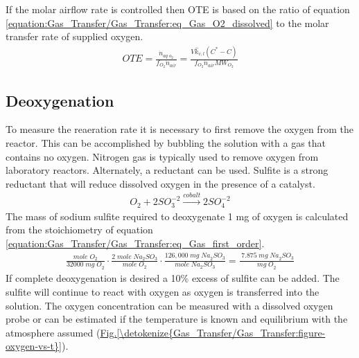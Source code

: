 \documentclass[letterpaper,10pt,english]{sphinxmanual}
\begin{document}
If the molar airflow rate is controlled then OTE is based on the ratio of equation \eqref{equation:Gas_Transfer/Gas_Transfer:eq_Gas_O2_dissolved} to the molar transfer rate of supplied oxygen.
\begin{equation}\label{equation:Gas_Transfer/Gas_Transfer:Gas_Transfer/Gas_Transfer:4}
\begin{split}OTE=\frac{\dot{n}_{aq\; o_{2} } }{f_{O_{2} } \dot{n}_{air} } =\frac{V\hat{k}_{v,l} \left(C^{*} -C\right)}{f_{O_{2} } \dot{n}_{air} MW_{O_{2} } }\end{split}
\end{equation}

\subsection{Deoxygenation}
\label{\detokenize{Gas_Transfer/Gas_Transfer:deoxygenation}}\label{\detokenize{Gas_Transfer/Gas_Transfer:heading-gas-transfer-deoxygenation}}
To measure the reaeration rate it is necessary to first remove the oxygen from the reactor. This can be accomplished by bubbling the solution with a gas that contains no oxygen. Nitrogen gas is typically used to remove oxygen from laboratory reactors. Alternately, a reductant can be used. Sulfite is a strong reductant that will reduce dissolved oxygen in the presence of a catalyst.
\begin{equation}\label{equation:Gas_Transfer/Gas_Transfer:Gas_Transfer/Gas_Transfer:5}
\begin{split}{O}_{{2}} +{2SO}_{{3}}^{-{2}} \stackrel{{cobalt}}{\longrightarrow}{2SO}_{{4}}^{-{2}}\end{split}
\end{equation}
The mass of sodium sulfite required to deoxygenate 1 mg of oxygen is calculated from the stoichiometry of equation \eqref{equation:Gas_Transfer/Gas_Transfer:eq_Gas_first_order}.
\begin{equation}\label{equation:Gas_Transfer/Gas_Transfer:Gas_Transfer/Gas_Transfer:6}
\begin{split}\frac{{mole\; O}_{{2}} }{{32000\; mg\; O}_{{2}} } \cdot \frac{{2\; mole\; Na}_{{2}} {SO}_{{3}} }{{mole\; O}_{{2}} } \cdot \frac{{126,000\; mg\; Na}_{{2}} {SO}_{{3}} }{{mole\; Na}_{{2}} {SO}_{{3}} } =\frac{{\; 7.875\; mg\; Na}_{{2}} {SO}_{{3}} }{{mg\; O}_{{2}} }\end{split}
\end{equation}
If complete deoxygenation is desired a 10\% excess of sulfite can be added. The sulfite will continue to react with oxygen as oxygen is transferred into the solution. The oxygen concentration can be measured with a dissolved oxygen probe or can be estimated if the temperature is known and equilibrium with the atmosphere assumed (\hyperref[\detokenize{Gas_Transfer/Gas_Transfer:figure-oxygen-vs-t}]{Fig.\@ \ref{\detokenize{Gas_Transfer/Gas_Transfer:figure-oxygen-vs-t}}}).
\end{document}
